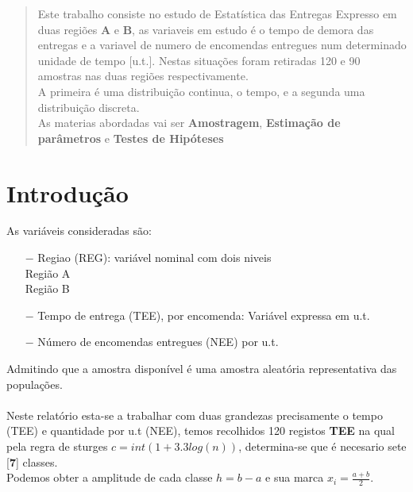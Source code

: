
%

%
\tableofcontents
%
\appendix
%
\pagestyle{plain}%
\newpage
\label{Resumo}
\begin{abstract}
Este trabalho consiste no estudo de Estatística das Entregas Expresso em  duas regiões \textbf{A} e \textbf{B}, as variaveis em estudo é o tempo de demora das entregas e a variavel de numero de encomendas entregues num determinado unidade de tempo [u.t.]. Nestas situações foram retiradas 120 e 90 amostras nas duas regiões respectivamente.\\
A primeira é uma distribuição continua, o tempo, e a segunda uma distribuição discreta.
\\
As materias abordadas vai ser \textbf{Amostragem}, \textbf{Estimação de parâmetros} e \textbf{Testes de Hipóteses}\\
\end{abstract}
%
\newpage
\setcounter{section}{0}
\section{Introdução}\label{Introdução}
%
As variáveis consideradas são:
\begin{itemize}
\item[$-$] Regiao (REG): variável nominal com dois niveis\\
\qquad Região A \\
\qquad Região B
\item [$-$] Tempo de entrega (TEE), por encomenda: Variável expressa em u.t.
\item [$-$] Número de encomendas entregues (NEE) por u.t.
\end{itemize}
Admitindo que a amostra disponível é uma amostra aleatória representativa das populações.\\
\\
Neste relatório esta-se a trabalhar com duas  grandezas precisamente o tempo (TEE) e quantidade por u.t (NEE), temos recolhidos 120 registos \textbf{TEE} na qual pela regra de sturges $c = int(1+3.3log(n))$, determina-se que é necesario sete [\textbf{7}] classes. \\
Podemos obter a amplitude de cada classe $h=b-a$ e sua marca $x_i=\frac{a+b}{2}$. \\
